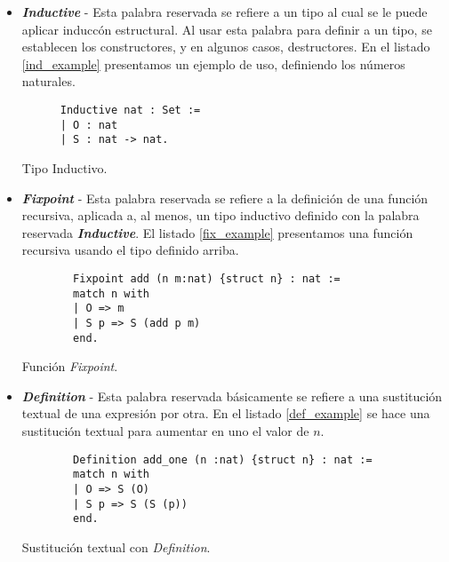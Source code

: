 \begin{itemize}
  \item \textbf{\textit{Inductive}} - Esta palabra reservada se refiere a un tipo al cual se le puede aplicar inducc\'on
    estructural. Al usar esta palabra para definir a un tipo, se establecen los constructores, y en algunos casos,
    destructores. En el listado \ref{ind_example} presentamos un ejemplo de uso, definiendo los 
    n\'umeros naturales.
    \begin{listing}[!ht]
    \centering
    \captionsetup{justification=centering}
    \begin{verbatim}
      Inductive nat : Set :=
      | O : nat
      | S : nat -> nat. 
    \end{verbatim}
    \caption{Tipo Inductivo.}
    \label{ind_example}
    \end{listing}
  \item \textbf{\textit{Fixpoint}} - Esta palabra reservada se refiere a la definici\'on de una funci\'on recursiva, aplicada a, al menos, 
    un tipo inductivo definido con la palabra reservada \textbf{\textit{Inductive}}. El listado \ref{fix_example} presentamos una funci\'on recursiva usando el tipo definido arriba. 
    \begin{listing}[!ht]
      \centering
      \captionsetup{justification=centering}
      \begin{verbatim}
        Fixpoint add (n m:nat) {struct n} : nat :=
        match n with
        | O => m
        | S p => S (add p m)
        end. 
      \end{verbatim}
      \caption{Funci\'on \textit{Fixpoint}.}
      \label{fix_example}
      \end{listing}
  \item \textbf{\textit{Definition}} - Esta palabra reservada b\'asicamente se refiere a una sustituci\'on textual de 
    una expresión por otra. En el listado \ref{def_example} se hace una sustituci\'on textual para aumentar en uno el valor de $n$.
    \begin{listing}[!ht]
      \centering
      \captionsetup{justification=centering}
      \begin{verbatim}
        Definition add_one (n :nat) {struct n} : nat :=
        match n with
        | O => S (O)
        | S p => S (S (p))
        end. 
      \end{verbatim}
      \caption{Sustituci\'on textual con \textit{Definition}.}
      \label{def_example}
      \end{listing}
\end{itemize}


